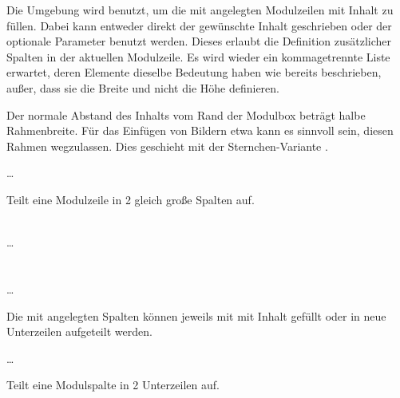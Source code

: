 Die Umgebung  wird benutzt,
um die mit  angelegten Modulzeilen mit Inhalt zu füllen.
Dabei kann entweder direkt der gewünschte Inhalt geschrieben oder der optionale
Parameter  benutzt werden.
Dieses erlaubt die Definition zusätzlicher Spalten in der aktuellen Modulzeile.
Es wird wieder ein kommagetrennte Liste erwartet,
deren Elemente dieselbe Bedeutung haben wie bereits beschrieben, außer, dass
sie die Breite und nicht die Höhe definieren.

Der normale Abstand des Inhalts vom Rand der Modulbox beträgt halbe
Rahmenbreite. Für das Einfügen von Bildern etwa kann es sinnvoll sein,
diesen Rahmen wegzulassen.
Dies geschieht mit der Sternchen-Variante .


\begin{minipage}{0.6\textwidth}
\begin{Example}\par
  \noindent{}
    \par
  \quad\dots\\
  \bigskip\par
  \noindent Teilt eine Modulzeile in 2 gleich große Spalten auf.
\end{Example}
\end{minipage}
\hfill
\begin{minipage}{0.3\textwidth}\centering
\end{minipage}

\begin{Declaration}
    \\%
  \quad\dots\\
  \\
    \\%
  \quad\dots\\
\end{Declaration}

Die mit  angelegten Spalten können jeweils mit 
 mit Inhalt gefüllt oder in neue Unterzeilen aufgeteilt 
werden.

\begin{minipage}{0.6\textwidth}
\begin{Example}\par
  \noindent{}
    \par
  \quad\dots\\
  \bigskip\par
  \noindent Teilt eine Modulspalte in 2 Unterzeilen auf.
\end{Example}
\end{minipage}
\hfill
\begin{minipage}{0.3\textwidth}\centering
\end{minipage}


